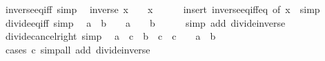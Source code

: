 \begin{isabellebody}
\endisatagproof
{\isafoldproof}%
%
\isadelimproof
\isanewline
%
\endisadelimproof
\isanewline
{}\isamarkupfalse%
\ inverse{\isacharunderscore}{\kern0pt}eq{\isacharunderscore}{\kern0pt}{}{\isacharunderscore}{\kern0pt}iff\ {\isacharbrackleft}{\kern0pt}simp{\isacharbrackright}{\kern0pt}{\isacharcolon}{\kern0pt}\isanewline
\ \ {\isachardoublequoteopen}inverse\ x\ {\isacharequal}{\kern0pt}\ {}\ {\isasymlongleftrightarrow}\ x\ {\isacharequal}{\kern0pt}\ {}{\isachardoublequoteclose}\isanewline
%
\isadelimproof
\ \ %
\endisadelimproof
%
\isatagproof
{}\isamarkupfalse%
\ {\isacharparenleft}{\kern0pt}insert\ inverse{\isacharunderscore}{\kern0pt}eq{\isacharunderscore}{\kern0pt}iff{\isacharunderscore}{\kern0pt}eq\ {\isacharbrackleft}{\kern0pt}of\ x\ {}{\isacharbrackright}{\kern0pt}{\isacharcomma}{\kern0pt}\ simp{\isacharparenright}{\kern0pt}%
\endisatagproof
{\isafoldproof}%
%
\isadelimproof
\isanewline
%
\endisadelimproof
\isanewline
{}\isamarkupfalse%
\ divide{\isacharunderscore}{\kern0pt}eq{\isacharunderscore}{\kern0pt}{}{\isacharunderscore}{\kern0pt}iff\ {\isacharbrackleft}{\kern0pt}simp{\isacharbrackright}{\kern0pt}{\isacharcolon}{\kern0pt}\isanewline
\ \ {\isachardoublequoteopen}a\ {\isacharslash}{\kern0pt}\ b\ {\isacharequal}{\kern0pt}\ {}\ {\isasymlongleftrightarrow}\ a\ {\isacharequal}{\kern0pt}\ {}\ {\isasymor}\ b\ {\isacharequal}{\kern0pt}\ {}{\isachardoublequoteclose}\isanewline
%
\isadelimproof
\ \ %
\endisadelimproof
%
\isatagproof
{}\isamarkupfalse%
\ {\isacharparenleft}{\kern0pt}simp\ add{\isacharcolon}{\kern0pt}\ divide{\isacharunderscore}{\kern0pt}inverse{\isacharparenright}{\kern0pt}%
\endisatagproof
{\isafoldproof}%
%
\isadelimproof
\isanewline
%
\endisadelimproof
\isanewline
{}\isamarkupfalse%
\ divide{\isacharunderscore}{\kern0pt}cancel{\isacharunderscore}{\kern0pt}right\ {\isacharbrackleft}{\kern0pt}simp{\isacharbrackright}{\kern0pt}{\isacharcolon}{\kern0pt}\isanewline
\ \ {\isachardoublequoteopen}a\ {\isacharslash}{\kern0pt}\ c\ {\isacharequal}{\kern0pt}\ b\ {\isacharslash}{\kern0pt}\ c\ {\isasymlongleftrightarrow}\ c\ {\isacharequal}{\kern0pt}\ {}\ {\isasymor}\ a\ {\isacharequal}{\kern0pt}\ b{\isachardoublequoteclose}\isanewline
%
\isadelimproof
\ \ %
\endisadelimproof
%
\isatagproof
{}\isamarkupfalse%
\ {\isacharparenleft}{\kern0pt}cases\ {\isachardoublequoteopen}c{\isacharequal}{\kern0pt}{}{\isachardoublequoteclose}{\isacharparenright}{\kern0pt}\ {\isacharparenleft}{\kern0pt}simp{\isacharunderscore}{\kern0pt}all\ add{\isacharcolon}{\kern0pt}\ divide{\isacharunderscore}{\kern0pt}inverse{\isacharparenright}{\kern0pt}%

\end{isabellebody}
